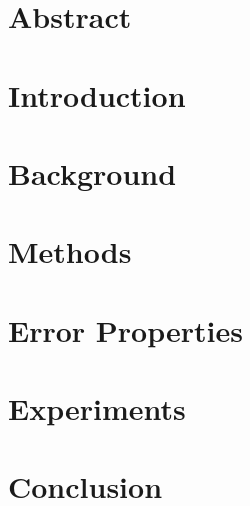 \section{Abstract}\label{sgpsec:abs}
	

\section{Introduction}\label{sgpsec:int}
	

\section{Background}\label{sgpsec:bac}
	

\section{Methods}\label{sgpsec:met}
	

\section{Error Properties}\label{sgpsec:err}
	

\section{Experiments}\label{sgpsec:exp}
	

\section{Conclusion}\label{sgpsec:con}
	
